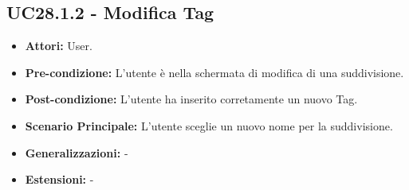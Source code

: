 \subsection{UC28.1.2 - Modifica Tag}
\begin{itemize}
    \item \textbf{Attori:} User.
    \item \textbf{Pre-condizione:}  L'utente è nella schermata di modifica di una  suddivisione.
    \item \textbf{Post-condizione:} L'utente ha inserito corretamente un nuovo Tag.
    \item \textbf{Scenario Principale:} L'utente sceglie un nuovo nome per la suddivisione.
    \item \textbf{Generalizzazioni:} -
    \item \textbf{Estensioni:} -
\end{itemize}

